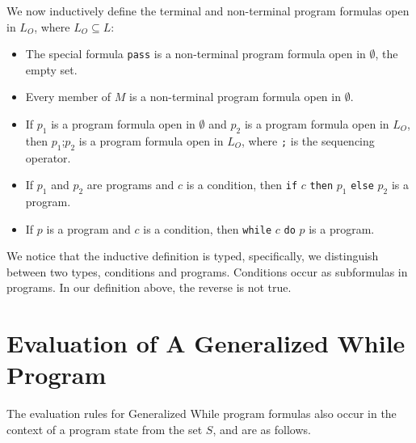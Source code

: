 \documentclass[11pt]{article}
\begin{document}
We now inductively define the terminal and non-terminal program formulas open in $L_{O}$, where $L_{O} \subseteq L$:

\begin{itemize}
\item The special formula \texttt{pass} is a non-terminal program formula open in $\emptyset$, the empty set.
\item Every member of $M$ is a non-terminal program formula open in $\emptyset$.
\item If $p_{1}$ is a program formula open in $\emptyset$ and $p_{2}$ is a program formula open in $L_{O}$, then $p_{1} \texttt{;} p_{2}$ is a program formula open in $L_{O}$, where \texttt{;} is the sequencing operator.
\item If $p_{1}$ and $p_{2}$ are programs and $c$ is a condition, then \texttt{if} $c$ \texttt{then} $p_{1}$ \texttt{else} $p_{2}$ is a program.
\item If $p$ is a program and $c$ is a condition, then \texttt{while} $c$ \texttt{do} $p$ is a program.
\end{itemize}

We notice that the inductive definition is typed, specifically, we distinguish between two types, conditions and programs.  Conditions occur as subformulas in programs.  In our definition above, the reverse is not true.

\section{Evaluation of A Generalized While Program}

The evaluation rules for Generalized While program formulas also occur in the context of a program state from the set $S$, and are as follows.
\end{document}
